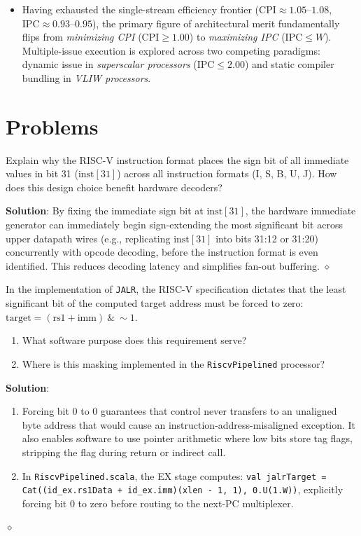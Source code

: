 \begin{itemize}
    \item Having exhausted the single-stream efficiency frontier ($\text{CPI} \approx 1.05\text{--}1.08$, $\text{IPC} \approx 0.93\text{--}0.95$), the primary figure of architectural merit fundamentally flips from \textit{minimizing CPI} ($\text{CPI} \ge 1.00$) to \textit{maximizing IPC} ($\text{IPC} \le W$). Multiple-issue execution is explored across two competing paradigms: dynamic issue in \textit{superscalar processors} ($\text{IPC} \le 2.00$) and static compiler bundling in \textit{VLIW processors}.
\end{itemize}


\section{Problems}\label{riscvProblems}

\begin{problem}
Explain why the RISC-V instruction format places the sign bit of all immediate values in bit 31 ($\text{inst}[31]$) across all instruction formats (I, S, B, U, J). How does this design choice benefit hardware decoders?

\textbf{Solution}:
By fixing the immediate sign bit at $\text{inst}[31]$, the hardware immediate generator can immediately begin sign-extending the most significant bit across upper datapath wires (e.g., replicating $\text{inst}[31]$ into bits 31:12 or 31:20) concurrently with opcode decoding, before the instruction format is even identified. This reduces decoding latency and simplifies fan-out buffering.
$\diamond$
\end{problem}

\begin{problem}
In the implementation of \texttt{JALR}, the RISC-V specification dictates that the least significant bit of the computed target address must be forced to zero: $\text{target} = (\text{rs1} + \text{imm}) \ \& \ \sim 1$.
\begin{enumerate}
    \item What software purpose does this requirement serve?
    \item Where is this masking implemented in the \texttt{RiscvPipelined} processor?
\end{enumerate}

\textbf{Solution}:
\begin{enumerate}
    \item Forcing bit 0 to 0 guarantees that control never transfers to an unaligned byte address that would cause an instruction-address-misaligned exception. It also enables software to use pointer arithmetic where low bits store tag flags, stripping the flag during return or indirect call.
    \item In \texttt{RiscvPipelined.scala}, the EX stage computes:
    \texttt{val jalrTarget = Cat((id\_ex.rs1Data + id\_ex.imm)(xlen - 1, 1), 0.U(1.W))}, explicitly forcing bit 0 to zero before routing to the next-PC multiplexer.
\end{enumerate}
$\diamond$
\end{problem}

